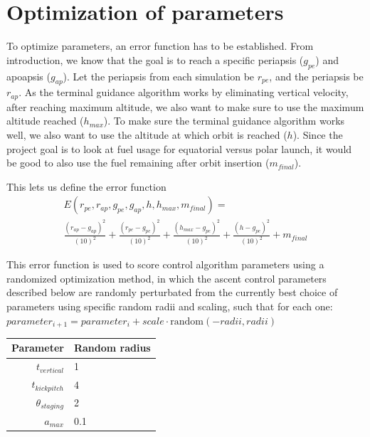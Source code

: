 \documentclass[11pt]{article}
\begin{document}
\section{Optimization of parameters}
To optimize parameters, an error function has to be established.
From introduction, we know that the goal is to reach a specific periapsis ($g_{pe}$) and apoapsis ($g_{ap}$). 
Let the periapsis from each simulation be $r_{pe}$, and the periapsis be $r_{ap}$.
As the terminal guidance algorithm works by eliminating vertical velocity, after reaching maximum altitude, we also want to make sure to use the maximum altitude reached ($h_{max}$).
To make sure the terminal guidance algorithm works well, we also want to use the altitude at which orbit is reached ($h$).
Since the project goal is to look at fuel usage for equatorial versus polar launch, it would be good to also use the fuel remaining after orbit insertion ($m_{final}$).

This lets us define the error function
$$
\begin{aligned}
E(r_{pe}, r_{ap}, g_{pe}, g_{ap}, h, h_{max}, m_{final}) = \\
\frac{{\left( r_{ap} - g_{ap} \right)}^2}{{\left( 10 \right)}^2} +
\frac{{\left( r_{pe} - g_{pe} \right)}^2}{{\left( 10 \right)}^2} +
\frac{{\left( h_{max} - g_{pe} \right)}^2}{{\left( 10 \right)}^2} +
\frac{{\left( h - g_{pe} \right)}^2}{{\left( 10 \right)}^2}
+ m_{final}
\end{aligned}
$$

This error function is used to score control algorithm parameters using a randomized optimization method, in which the ascent control parameters described below 
are randomly perturbated from the currently best choice of parameters using specific random radii and scaling, such that for each one: $parameter_{i+1} = parameter_{i} + scale \cdot \text{random}(-radii, radii)$
\begin{center}
  \begin{tabular}{ r | l  }
    Parameter & Random radius \\
    \hline
    $t_{vertical}$ & 1 \\
    $t_{kickpitch}$ & 4 \\
    $\theta_{staging}$ & 2 \\
    $a_{max}$ & 0.1 \\
  \end{tabular}
\end{center}
\end{document}
